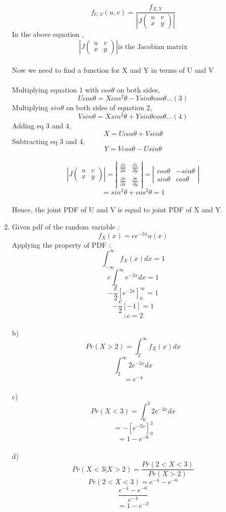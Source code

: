 \documentclass{article}
\begin{document}
\begin{enumerate}
  $$ f_{U,V}(u,v)=\frac{f_{X,Y}}{\left|J\left(\begin{matrix}
      u & v \\
      x & y
    \end{matrix}\right)\right|}
  $$
  In the above equation ,
  $$
  \left|J\left(\begin{matrix}
    u & v \\
    x & y
  \end{matrix}\right)\right| \text{is the Jacobian matrix} $$
  \\
  Now we need to find a function for X and Y in terms of U and V \\
  \\
  Multiplying equation 1 with $cos\theta$ on both sides,
  $$Ucos\theta = Xcos^2\theta-Ysin\theta cos\theta ... (3)$$
  Multiplying $sin\theta$ on both sides of equation 2,
  $$Vsin\theta=Xsin^2\theta + Ysin\theta cos\theta ... (4)$$
  Adding eq 3 and 4,
  $$X=U cos\theta +Vsin\theta$$
  Subtracting eq 3 and 4,
  $$Y=Vcos\theta -U sin\theta$$
  \\
  $$
  \left|J\left(\begin{matrix}
    u & v \\
    x & y
  \end{matrix}\right)\right| =
  \left|
  \begin{matrix}
    \frac{\partial z}{\partial x} &  \frac{\partial z}{\partial y}\\
    \frac{\partial v}{\partial x} &  \frac{\partial v}{\partial y}
  \end{matrix}\right|
  =\left|
  \begin{matrix}
    cos\theta & -sin\theta \\ sin\theta & cos\theta
  \end{matrix}
  \right|
  $$
  $$= sin^2\theta+cos^2\theta = 1$$
  \\
  Hence, the joint PDF of U and V  is equal to joint PDF of X and Y.\\

  \newpage

\item
  Given pdf of the random variable :
  $$f_{X}(x)=ce^{-2x}u(x)$$
  Applying the property of PDF :
  $$\int_{-\infty}^{\infty}f_{X}(x)dx=1$$
  $$c\int_{0}^{\infty}e^{-2x}dx=1$$
  $$-\frac{c}{2}[e^{-2x}]_{0}^{\infty} = 1$$
  $$ -\frac{c}{2}[-1]=1$$
  $$\therefore c=2$$
  \\
  b) $$Pr(X>2)= \int_{2}^{\infty}f_{X}(x)dx$$
  $$ \int_{2}^{\infty}2e^{-2x}dx $$
  $$ = e^{-4}$$
  \\
  c) $$Pr(X<3) = \int_{0}^{3}2e^{-2x}dx $$
  $$ = -[e^{-2x}]_{0}^{3}$$
  $$= 1-e^{-6}$$\\
  d) $$ Pr(X<3 | X>2) = \frac{ Pr(2<X<3)}{Pr(X>2)}$$
  $$Pr(2<X<3) = e^{-4}-e^{-6}$$
  $$ \frac{e^{-4}-e^{-6}}{e^{-4}}$$
  $$= 1-e^{-2}$$


\end{enumerate}
\end{document}

